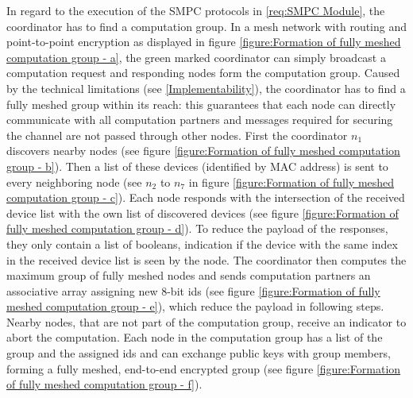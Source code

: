		In regard to the execution of the \gls{SMPC} protocols in \ref{req:SMPC Module}, the coordinator has to find a computation group. In a mesh network with routing and point-to-point encryption as displayed in figure \ref{figure:Formation of fully meshed computation group - a}, the green marked coordinator can simply broadcast a computation request and responding nodes form the computation group. Caused by the technical limitations (see \ref{Implementability}), the coordinator has to find a fully meshed group within its reach: this guarantees that each node can directly communicate with all computation partners and messages required for securing the channel are not passed through other nodes. First the coordinator $n_1$ discovers nearby nodes (see figure \ref{figure:Formation of fully meshed computation group - b}). Then a list of these devices (identified by \gls{MAC} address) is sent to every neighboring node (see $n_2$ to $n_7$ in figure \ref{figure:Formation of fully meshed computation group - c}). Each node responds with the intersection of the received device list with the own list of discovered devices (see figure \ref{figure:Formation of fully meshed computation group - d}). To reduce the payload of the responses, they only contain a list of booleans, indication if the device with the same index in the received device list is seen by the node. The coordinator then computes the maximum group of fully meshed nodes and sends computation partners an associative array assigning new 8-bit ids (see figure \ref{figure:Formation of fully meshed computation group - e}), which reduce the payload in following steps. Nearby nodes, that are not part of the computation group, receive an indicator to abort the computation. Each node in the computation group has a list of the group and the assigned ids and can exchange public keys with group members, forming a fully meshed, end-to-end encrypted group (see figure \ref{figure:Formation of fully meshed computation group - f}).
		
